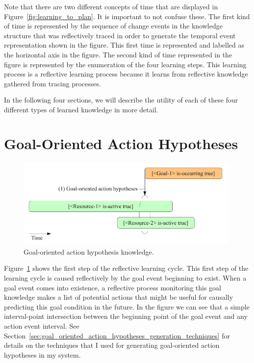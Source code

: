 Note that there are two different concepts of time that are displayed
in Figure~\ref{fig:learning_to_plan}.  It is important to not confuse
these.  The first kind of time is represented by the sequence of
change events in the knowledge structure that was reflectively traced
in order to generate the temporal event representation shown in the
figure.  This first time is represented and labelled as the horizontal
axis in the figure.  The second kind of time represented in the figure
is represented by the enumeration of the four learning steps.  This
learning process is a reflective learning process because it learns
from reflective knowledge gathered from tracing processes.

In the following four sections, we will describe the utility of each
of these four different types of learned knowledge in more detail.

\section{Goal-Oriented Action Hypotheses}
\label{sec:goal_oriented_action_hypotheses}

\begin{figure}[bth]
  \center
  \includegraphics[width=11cm]{gfx/learning_to_plan-1-goal_oriented_action_hypotheses}
  \caption[Goal-oriented action hypothesis knowledge]{Goal-oriented action hypothesis knowledge.}
  \label{fig:goal_oriented_action_hypotheses}
\end{figure}

Figure~\ref{fig:goal_oriented_action_hypotheses} shows the first step
of the reflective learning cycle.  This first step of the learning
cycle is caused reflectively by the goal event beginning to exist.
When a goal event comes into existence, a reflective process
monitoring this goal knowledge makes a list of potential actions that
might be useful for causally predicting this goal condition in the
future.  In the figure we can see that a simple interval-point
intersection between the beginning point of the goal event and any
action event interval.  See
Section~\ref{sec:goal_oriented_action_hypotheses_generation_techniques}
for details on the techniques that I used for generating goal-oriented
action hypotheses in my system.


